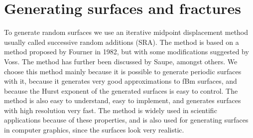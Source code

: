 \chapter{Generating surfaces and fractures\label{chap:generating_surfaces}}


To generate random surfaces we use an iterative midpoint displacement method usually called successive random additions (SRA). The method is based on a method proposed by Fourner in 1982\cite{fournier1982computer}, but with some modifications suggested by Voss\cite{voss1985random, voss1988fractals}. The method has further been discussed by Saupe\cite{saupe1988algorithms}, amongst others. We choose this method mainly because it is possible to generate periodic surfaces with it, because it generates very good approximations to fBm surfaces\cite{zhou2005comparison}, and because the Hurst exponent of the generated surfaces is easy to control. The method is also easy to understand, easy to implement, and generates surfaces with high resolution very fast. The method is widely used in scientific applications because of these properties, and is also used for generating surfaces in computer graphics, since the surfaces look very realistic.

